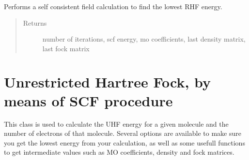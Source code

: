 \documentclass[letterpaper,10pt,english]{sphinxmanual}
\begin{document}
\begin{fulllineitems}
\begin{fulllineitems}
\begin{quote}
\begin{description}
\end{description}\end{quote}

\end{fulllineitems}


\begin{fulllineitems}
\label{\detokenize{RHF:ghf.RHF.RHF.scf}}
Performs a self consistent field calculation to find the lowest RHF energy.
\begin{quote}\begin{description}
\item[{Returns}] \leavevmode
number of iterations, scf energy, mo coefficients, last density matrix, last fock matrix

\end{description}\end{quote}

\end{fulllineitems}


\end{fulllineitems}

\label{\detokenize{UHF:module-ghf.UHF}}

\chapter{Unrestricted Hartree Fock, by means of SCF procedure}
\label{\detokenize{UHF:unrestricted-hartree-fock-by-means-of-scf-procedure}}\label{\detokenize{UHF::doc}}
This class is used to calculate the UHF energy for a given molecule and the number of electrons of that molecule.
Several options are available to make sure you get the lowest energy from your calculation, as well as some usefull
functions to get intermediate values such as MO coefficients, density and fock matrices.
\end{document}
